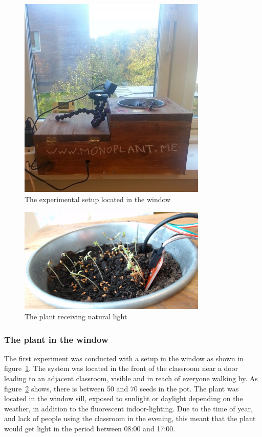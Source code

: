 \begin{figure}
\centering
\includegraphics[width=0.8\textwidth]{img/empiricalsetting/window.jpg}
\caption{The experimental setup located in the window}
\label{fig:windowplant}
\end{figure}

\begin{figure}
\centering
\includegraphics[width=0.8\textwidth]{img/empiricalsetting/windowsystem.jpg}
\caption{The plant receiving natural light}
\label{fig:windowsystemplant}
\end{figure}

\subsubsection*{The plant in the window}
The first experiment was conducted with a setup in the window as shown in figure~\ref{fig:windowplant}. The system was located in the front of the classroom near a door leading to an adjacent classroom, visible and in reach of everyone walking by. As figure~\ref{fig:windowsystemplant} shows, there is between 50 and 70 seeds in the pot. The plant was located in the window sill, exposed to sunlight or daylight depending on the weather, in addition to the fluorescent indoor-lighting. Due to the time of year, and lack of people using the classroom in the evening, this meant that the plant would get light in the period between 08:00 and 17:00.

